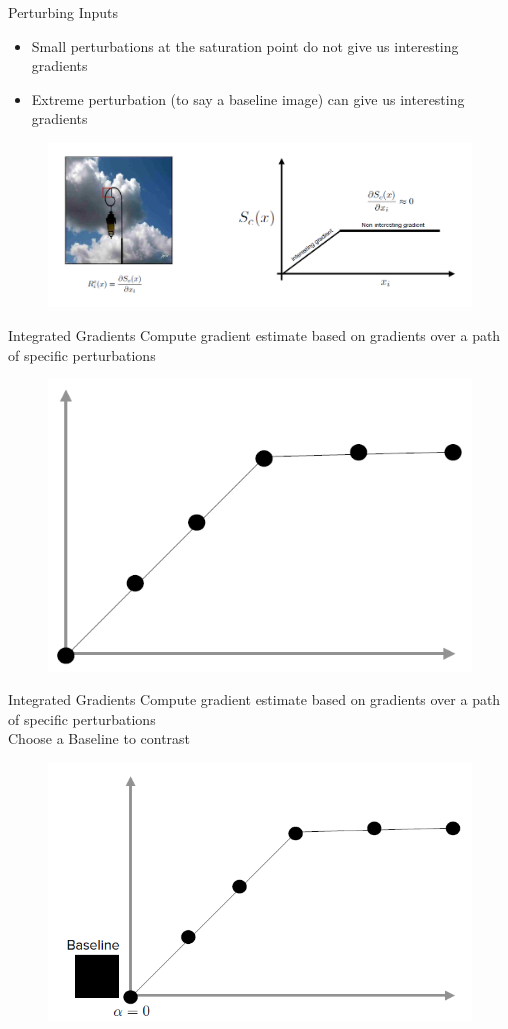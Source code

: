 \documentclass[11pt,compress,t,notes=noshow, aspectratio=169, xcolor=table]{beamer}
\begin{document}
\begin{frame}{Perturbing Inputs}
\begin{itemize}
    \item Small perturbations at the saturation point do not give us interesting gradients
    \item Extreme perturbation (to say a baseline image) can give us interesting gradients
\end{itemize}
\begin{figure}
    \centering
    \includegraphics[scale=.5]{bild23}
\end{figure}
\end{frame}

\begin{frame}{Integrated Gradients}
    Compute gradient estimate based on gradients over a path of specific perturbations
    \begin{figure}
    \bigskip
    \bigskip
       \includegraphics[width=0.6\linewidth]{bild28}
    \end{figure}
\end{frame}

\begin{frame}{Integrated Gradients}
    Compute gradient estimate based on gradients over a path of specific perturbations\\
    Choose a Baseline to contrast %
    \begin{figure}
    \bigskip
    \bigskip
       \includegraphics[width=0.6\linewidth]{bild29}
    \end{figure}
\end{frame}
\end{document}
